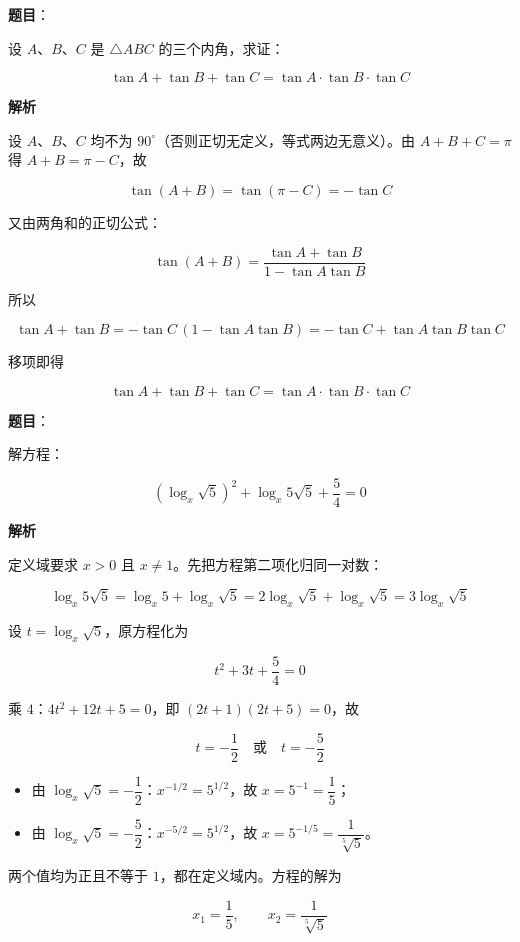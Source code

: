 \begin{answer}

\textbf{题目}：

设 $A$、$B$、$C$ 是 $\triangle ABC$ 的三个内角，求证：

\nopagebreak[4]
\[
\tan A+\tan B+\tan C=\tan A\cdot\tan B\cdot\tan C
\]

\textbf{解析}

设 $A$、$B$、$C$ 均不为 $90^\circ$（否则正切无定义，等式两边无意义）。由 $A+B+C=\pi$ 得 $A+B=\pi-C$，故

\nopagebreak[4]
\[
\tan(A+B)=\tan(\pi-C)=-\tan C
\]

又由两角和的正切公式：

\nopagebreak[4]
\[
\tan(A+B)=\frac{\tan A+\tan B}{1-\tan A\tan B}
\]

所以

\nopagebreak[4]
\[
\tan A+\tan B=-\tan C\,(1-\tan A\tan B)=-\tan C+\tan A\tan B\tan C
\]

移项即得

\nopagebreak[4]
\[
\tan A+\tan B+\tan C=\tan A\cdot\tan B\cdot\tan C
\]


\end{answer}
\begin{answer}

\textbf{题目}：

解方程：

\nopagebreak[4]
\[
\left(\log_x\sqrt5\right)^2+\log_x 5\sqrt5+\frac54=0
\]

\textbf{解析}

定义域要求 $x>0$ 且 $x\neq1$。先把方程第二项化归同一对数：

\nopagebreak[4]
\[
\log_x 5\sqrt5=\log_x 5+\log_x\sqrt5=2\log_x\sqrt5+\log_x\sqrt5=3\log_x\sqrt5
\]

设 $t=\log_x\sqrt5$，原方程化为

\nopagebreak[4]
\[
t^2+3t+\frac54=0
\]

乘 $4$：$4t^2+12t+5=0$，即 $(2t+1)(2t+5)=0$，故

\nopagebreak[4]
\[
t=-\frac12\quad\text{或}\quad t=-\frac52
\]

\begin{itemize}
\item 由 $\log_x\sqrt5=-\dfrac12$：$x^{-1/2}=5^{1/2}$，故 $x=5^{-1}=\dfrac15$；
\item 由 $\log_x\sqrt5=-\dfrac52$：$x^{-5/2}=5^{1/2}$，故 $x=5^{-1/5}=\dfrac1{\sqrt[5]5}$。
\end{itemize}

两个值均为正且不等于 $1$，都在定义域内。方程的解为

\nopagebreak[4]
\[
x_1=\frac15,\qquad x_2=\frac1{\sqrt[5]5}
\]


\end{answer}
